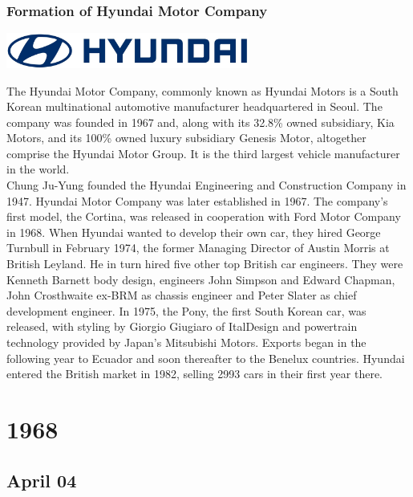 \documentclass[11pt]{report}
\begin{document}
\subsection{Formation of Hyundai Motor Company}
\vspace{2mm}\begin{center}\includegraphics[width=8cm]{./img/hyundaiLogo.jpg}\end{center}
The Hyundai Motor Company, commonly known as Hyundai Motors is a South Korean multinational automotive manufacturer headquartered in Seoul. The company was founded in 1967 and, along with its 32.8\% owned subsidiary, Kia Motors, and its 100\% owned luxury subsidiary Genesis Motor, altogether comprise the Hyundai Motor Group. It is the third largest vehicle manufacturer in the world.\\ \indent Chung Ju-Yung founded the Hyundai Engineering and Construction Company in 1947. Hyundai Motor Company was later established in 1967. The company's first model, the Cortina, was released in cooperation with Ford Motor Company in 1968. When Hyundai wanted to develop their own car, they hired George Turnbull in February 1974, the former Managing Director of Austin Morris at British Leyland. He in turn hired five other top British car engineers. They were Kenneth Barnett body design, engineers John Simpson and Edward Chapman, John Crosthwaite ex-BRM as chassis engineer and Peter Slater as chief development engineer. In 1975, the Pony, the first South Korean car, was released, with styling by Giorgio Giugiaro of ItalDesign and powertrain technology provided by Japan's Mitsubishi Motors. Exports began in the following year to Ecuador and soon thereafter to the Benelux countries. Hyundai entered the British market in 1982, selling 2993 cars in their first year there.

\chapter{1968}
\section{April 04}
\end{document}
